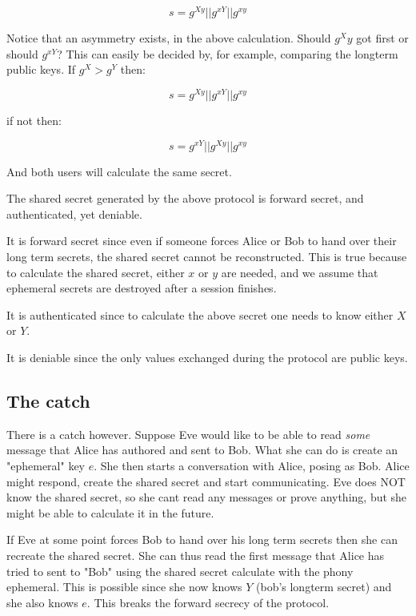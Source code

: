 \[
  s = g^{Xy} || g^{xY} || g^{xy}
\]

Notice that an asymmetry exists, in the above calculation.
Should $g^Xy$ got first or should $g^{xY}$?
This can easily be decided by, for example, comparing the longterm public keys.
If $g^X > g^Y$ then:

\[
  s = g^{Xy} || g^{xY} || g^{xy}
\]

if not then:

\[
  s = g^{xY}|| g^{Xy} || g^{xy}
\]

And both users will calculate the same secret.

The shared secret generated by the above protocol is forward secret, and authenticated, yet deniable.

It is forward secret since even if someone forces Alice or Bob to hand over their long term secrets, the shared secret cannot be reconstructed.
This is true because to calculate the shared secret, either $x$ or $y$ are needed, and we assume that ephemeral secrets are destroyed after a session finishes.

It is authenticated since to calculate the above secret one needs to know either $X$ or $Y$.

It is deniable since the only values exchanged during the protocol are public keys.

\subsection{The catch}


There is a catch however. Suppose Eve would like to be able to read \emph{some} message that Alice has authored and sent to Bob.
What she can do is create an "ephemeral" key $e$.
She then starts a conversation with Alice, posing as Bob.
Alice might respond, create the shared secret and start communicating.
Eve does NOT know the shared secret, so she cant read any messages or prove anything, but she might be able to calculate it in the future.

If Eve at some point forces Bob to hand over his long term secrets then she can recreate the shared secret.
She can thus read the first message that Alice has tried to sent to "Bob" using the shared secret calculate with the phony ephemeral.
This is possible since she now knows $Y$ (bob's longterm secret) and she also knows $e$.
This breaks the forward secrecy of the protocol.
